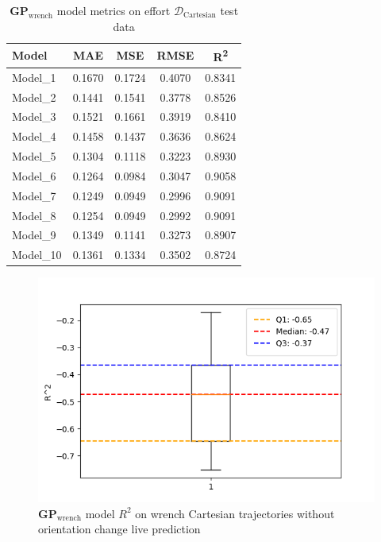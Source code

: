     \begin{table}[H]
    \centering
    \begin{tabular}{lcccc}
    \toprule
    \textbf{Model} & \textbf{MAE} & \textbf{MSE} & \textbf{RMSE} & \textbf{R\textsuperscript{2}} \\
    \midrule
    Model\_1 & 0.1670 & 0.1724 & 0.4070 & 0.8341 \\
    Model\_2 & 0.1441 & 0.1541 & 0.3778 & 0.8526 \\
    Model\_3 & 0.1521 & 0.1661 & 0.3919 & 0.8410 \\
    Model\_4 & 0.1458 & 0.1437 & 0.3636 & 0.8624 \\
    Model\_5 & 0.1304 & 0.1118 & 0.3223 & 0.8930 \\
    Model\_6 & 0.1264 & 0.0984 & 0.3047 & 0.9058 \\
    Model\_7 & 0.1249 & 0.0949 & 0.2996 & 0.9091 \\
    Model\_8 & 0.1254 & 0.0949 & 0.2992 & 0.9091 \\
    Model\_9 & 0.1349 & 0.1141 & 0.3273 & 0.8907 \\
    Model\_10 & 0.1361 & 0.1334 & 0.3502 & 0.8724 \\
    \bottomrule
    \end{tabular}
    \caption{\(\boldsymbol{GP}_{\text{wrench}}\) model metrics on effort \(\mathcal{D}_{\text{Cartesian}}\) test data}
    \end{table}

    \begin{figure}[H]
    \centering
    \includegraphics[width=1\columnwidth]{Images/05_results/wrench_boxplot_live_non_OC_R^2.png}
    \caption[\(\boldsymbol{GP}_{\text{wrench}}\) model \(R^2\) on wrench Cartesian trajectories without orientation change live prediction]{\(\boldsymbol{GP}_{\text{wrench}}\) model \(R^2\) on wrench Cartesian trajectories without orientation change live prediction}
    \label{fig:wrench_no_oc_R^2_live}
    \end{figure}

